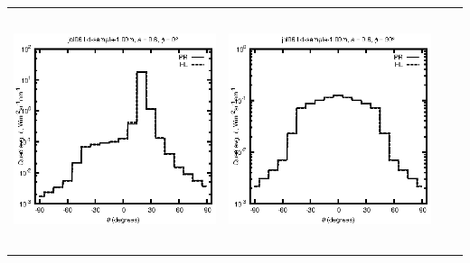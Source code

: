 \begin{tabular}{c c c c}
\includegraphics[height=7cm]{../eps/jol06_Ld_sample_1.00m_fwd.eps} &
\includegraphics[height=7cm]{../eps/jol06_Ld_sample_1.00m_cross.eps} \\
\end{tabular}

\pagebreak

